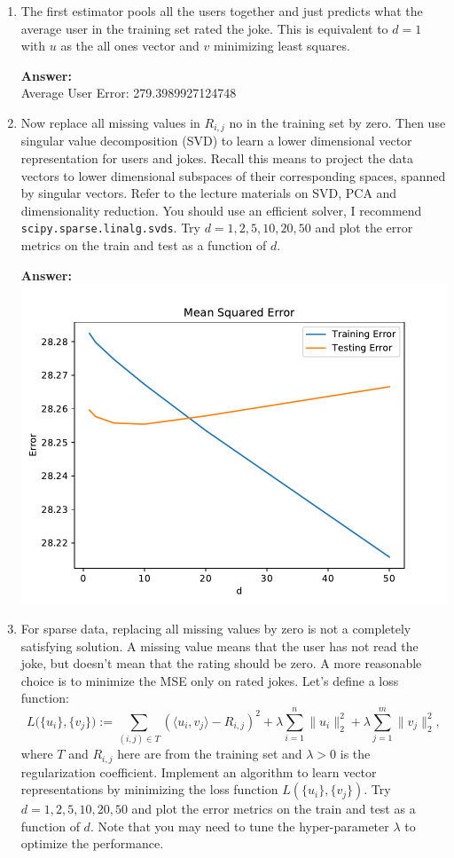 \documentclass{article}
\newcommand{\1}{\mathbf{1}}
\begin{document}
\begin{enumerate}
\item The first estimator pools all the users together and just predicts what the average user in the training set rated the joke. This is equivalent to $d=1$ with $u$ as the all ones vector and $v$ minimizing least squares.    

\textbf{Answer:}\\
Average User Error: 279.3989927124748

\item Now replace all missing values in $R_{i,j}$ no in the training set by zero. Then use singular value decomposition (SVD) to learn a lower dimensional vector representation for users and jokes. Recall this means to project the data vectors to lower dimensional subspaces of their corresponding spaces, spanned by singular vectors. Refer to the lecture materials on SVD, PCA and dimensionality reduction. You should use an efficient solver, I recommend \texttt{scipy.sparse.linalg.svds}. Try $d=1,2,5,10,20,50$ and plot the error metrics on the train and test as a function of $d$. 

\textbf{Answer:}\\
\includegraphics[width=4 in]{Figures/svd_err_mse.pdf}

\item For sparse data, replacing all missing values by zero is not a completely satisfying solution. A missing value means that the user has not read the joke, but doesn't mean that the rating should be zero. A more reasonable choice is to minimize the MSE only on rated jokes. Let's define a loss function:
\[
  L\Big(\{u_i\},\{v_j\}\Big) := \sum_{(i,j)\in T} (\langle u_i,v_j\rangle - R_{i,j})^2
  + \lambda \sum_{i=1}^n \|u_i\|_2^2 + \lambda \sum_{j=1}^m \|v_j\|_2^2,
\]
where $T$ and $R_{i,j}$ here are from the training set and $\lambda > 0$ is the regularization coefficient. Implement an algorithm to learn vector representations by minimizing the loss function $L(\{u_i\},\{v_j\})$.
Try $d=1,2,5,10,20,50$ and plot the error metrics on the train and test as a function of $d$. 
Note that you may need to tune the hyper-parameter $\lambda$ to optimize the performance.


\end{enumerate}
\end{document}
